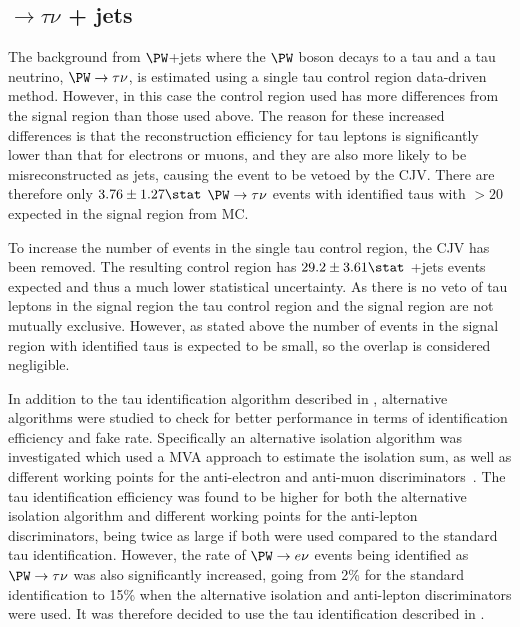\subsection{\PW$\rightarrow \tau\nu$ + jets}
\label{sec:promptwtaunu}
The background from $\PW$+jets where the $\PW$ boson decays to a tau and a tau neutrino, $\PW\rightarrow\tau\nu$, is estimated using a single tau control region data-driven method. However, in this case the control region used has more differences from the signal region than those used above. The reason for these increased differences is that the reconstruction efficiency for tau leptons is significantly lower than that for electrons or muons, and they are also more likely to be misreconstructed as jets, causing the event to be vetoed by the \ac{CJV}. There are therefore only $3.76\pm 1.27\stat$ $\PW\rightarrow\tau\nu$ events with identified taus with \pt$>20$ \GeV expected in the signal region from \ac{MC}.

To increase the number of events in the single tau control region, the \ac{CJV} has been removed. The resulting control region has $29.2\pm 3.61\stat$ \PW+jets events expected and thus a much lower statistical uncertainty. As there is no veto of tau leptons in the signal region the tau control region and the signal region are not mutually exclusive. However, as stated above the number of events in the signal region with identified taus is expected to be small, so the overlap is considered negligible.

In addition to the tau identification algorithm described in , alternative algorithms were studied to check for better performance in terms of identification efficiency and fake rate. Specifically an alternative isolation algorithm was investigated which used a \ac{MVA} approach to estimate the isolation sum, as well as different working points for the anti-electron and anti-muon discriminators~\cite{CMS-PAS-TAU-11-001}. The tau identification efficiency was found to be higher for both the alternative isolation algorithm and different working points for the anti-lepton discriminators, being twice as large if both were used compared to the standard tau identification. However, the rate of $\PW\rightarrow e\nu$ events being identified as $\PW\rightarrow\tau\nu$ was also significantly increased, going from 2\% for the standard identification to 15\% when the alternative isolation and anti-lepton discriminators were used. It was therefore decided to use the tau identification described in .

